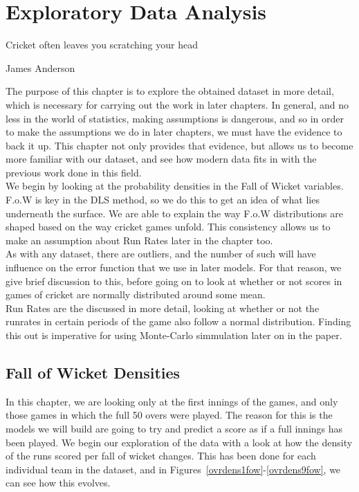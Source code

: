 \chapter{Exploratory Data Analysis}

\epigraph{Cricket often leaves you scratching your head}{James Anderson}

The purpose of this chapter is to explore the obtained dataset in more detail, which is necessary for carrying out the work in later chapters. In general, and no less
in the world of statistics, making assumptions is dangerous, and so in order to make the assumptions we do in later chapters, we must have the evidence to back it up.
This chapter not only provides that evidence, but allows us to become more familiar with our dataset, and see how modern data fits in with the previous work done in this 
field. \\
We begin by looking at the probability densities in the Fall of Wicket variables. F.o.W is key in the DLS method, so we do this to get an idea of what lies underneath the
surface. We are able to explain the way F.o.W distributions are shaped based on the way cricket games unfold. This consistency allows us to make an assumption about Run Rates
later in the chapter too. \\
As with any dataset, there are outliers, and the number of such will have influence on the error function that we use in later models. For that reason, we give brief discussion 
to this, before going on to look at whether or not scores in games of cricket are normally distributed around some mean. \\
Run Rates are the discussed in more detail, looking at whether or not the runrates in certain periods of the game also follow a normal distribution. Finding this out is imperative
for using Monte-Carlo simmulation later on in the paper.

\section{Fall of Wicket Densities}

In this chapter, we are looking only at the first innings of the games, and only those games in which the full 50 overs were played. The 
reason for this is the models we will build are going to try and predict a score as if a full innings has been played. We begin our exploration of the data with a look at how the density of the runs scored per fall of wicket changes. This has been done for each
individual team in the dataset, and in Figures~\ref{ovrdens1fow}-\ref{ovrdens9fow}, we can see how this evolves.  


